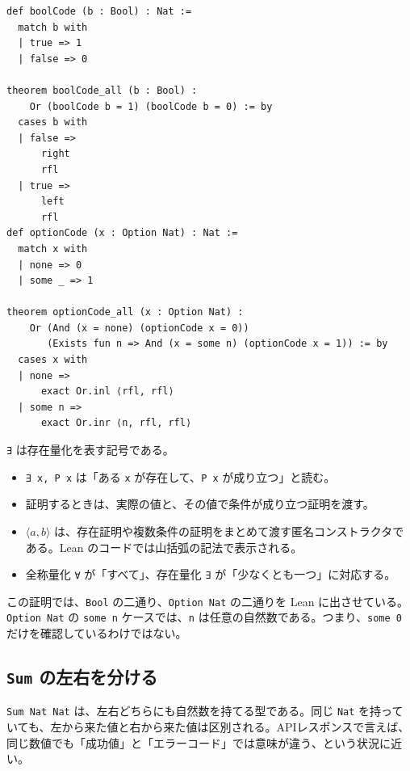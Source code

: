 \begin{listing}[htbp]
\begin{verbatim}
def boolCode (b : Bool) : Nat :=
  match b with
  | true => 1
  | false => 0

theorem boolCode_all (b : Bool) :
    Or (boolCode b = 1) (boolCode b = 0) := by
  cases b with
  | false =>
      right
      rfl
  | true =>
      left
      rfl
def optionCode (x : Option Nat) : Nat :=
  match x with
  | none => 0
  | some _ => 1

theorem optionCode_all (x : Option Nat) :
    Or (And (x = none) (optionCode x = 0))
       (Exists fun n => And (x = some n) (optionCode x = 1)) := by
  cases x with
  | none =>
      exact Or.inl ⟨rfl, rfl⟩
  | some n =>
      exact Or.inr ⟨n, rfl, rfl⟩
\end{verbatim}
\caption{\texttt{Bool}、\texttt{Option}、\texttt{Sum} の基本的な場合分け}
\label{lst:ch13-basic-cases}
\end{listing}

\begin{syntaxbox}
\texttt{∃} は存在量化を表す記号である。
\begin{itemize}
\item \texttt{∃ x, P x} は「ある \texttt{x} が存在して、\texttt{P x} が成り立つ」と読む。
\item 証明するときは、実際の値と、その値で条件が成り立つ証明を渡す。
\item \(\langle a, b\rangle\) は、存在証明や複数条件の証明をまとめて渡す匿名コンストラクタである。Lean のコードでは山括弧の記法で表示される。
\item 全称量化 \texttt{∀} が「すべて」、存在量化 \texttt{∃} が「少なくとも一つ」に対応する。
\end{itemize}
\end{syntaxbox}


この証明では、\texttt{Bool} の二通り、\texttt{Option Nat} の二通りを Lean に出させている。\texttt{Option Nat} の \texttt{some n} ケースでは、\texttt{n} は任意の自然数である。つまり、\texttt{some 0} だけを確認しているわけではない。

\subsection{\texttt{Sum} の左右を分ける}

\texttt{Sum Nat Nat} は、左右どちらにも自然数を持てる型である。同じ \texttt{Nat} を持っていても、左から来た値と右から来た値は区別される。APIレスポンスで言えば、同じ数値でも「成功値」と「エラーコード」では意味が違う、という状況に近い。

